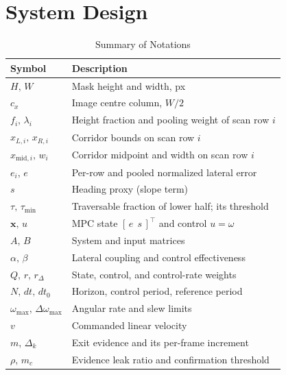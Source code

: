 \documentclass[conference]{IEEEtran}
\begin{document}
\section{System Design}
\label{sec:design}

\begin{table}[t]
\caption{Summary of Notations}
\label{tab:notation}
\centering
\begin{tabular}{ll}
\toprule
Symbol & Description \\
\midrule
$H,\,W$ & Mask height and width, px \\
$c_x$ & Image centre column, $W/2$ \\
$f_i,\,\lambda_i$ & Height fraction and pooling weight of scan row $i$ \\
$x_{L,i},\,x_{R,i}$ & Corridor bounds on scan row $i$ \\
$x_{\mathrm{mid},i},\,w_i$ & Corridor midpoint and width on scan row $i$ \\
$e_i,\,e$ & Per-row and pooled normalized lateral error \\
$s$ & Heading proxy (slope term) \\
$\tau,\,\tau_{\min}$ & Traversable fraction of lower half; its threshold \\
$\mathbf{x},\,u$ & MPC state $[\,e\;\,s\,]^{\!\top}$ and control $u=\omega$ \\
$A,\,B$ & System and input matrices \\
$\alpha,\,\beta$ & Lateral coupling and control effectiveness \\
$Q,\,r,\,r_\Delta$ & State, control, and control-rate weights \\
$N,\,dt,\,dt_0$ & Horizon, control period, reference period \\
$\omega_{\max},\,\Delta\omega_{\max}$ & Angular rate and slew limits \\
$v$ & Commanded linear velocity \\
$m,\,\Delta_k$ & Exit evidence and its per-frame increment \\
$\rho,\,m_c$ & Evidence leak ratio and confirmation threshold \\
\bottomrule
\end{tabular}
\end{table}
\end{document}
